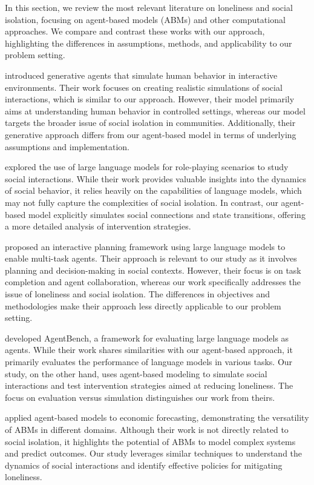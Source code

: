 \documentclass{article} %
\begin{document}
In this section, we review the most relevant literature on loneliness and social isolation, focusing on agent-based models (ABMs) and other computational approaches. We compare and contrast these works with our approach, highlighting the differences in assumptions, methods, and applicability to our problem setting.

\citet{park2023generative} introduced generative agents that simulate human behavior in interactive environments. Their work focuses on creating realistic simulations of social interactions, which is similar to our approach. However, their model primarily aims at understanding human behavior in controlled settings, whereas our model targets the broader issue of social isolation in communities. Additionally, their generative approach differs from our agent-based model in terms of underlying assumptions and implementation.

\citet{shanahan2023role} explored the use of large language models for role-playing scenarios to study social interactions. While their work provides valuable insights into the dynamics of social behavior, it relies heavily on the capabilities of language models, which may not fully capture the complexities of social isolation. In contrast, our agent-based model explicitly simulates social connections and state transitions, offering a more detailed analysis of intervention strategies.

\citet{wang2023describe} proposed an interactive planning framework using large language models to enable multi-task agents. Their approach is relevant to our study as it involves planning and decision-making in social contexts. However, their focus is on task completion and agent collaboration, whereas our work specifically addresses the issue of loneliness and social isolation. The differences in objectives and methodologies make their approach less directly applicable to our problem setting.

\citet{liu2023agentbench} developed AgentBench, a framework for evaluating large language models as agents. While their work shares similarities with our agent-based approach, it primarily evaluates the performance of language models in various tasks. Our study, on the other hand, uses agent-based modeling to simulate social interactions and test intervention strategies aimed at reducing loneliness. The focus on evaluation versus simulation distinguishes our work from theirs.

\citet{poledna2023economic} applied agent-based models to economic forecasting, demonstrating the versatility of ABMs in different domains. Although their work is not directly related to social isolation, it highlights the potential of ABMs to model complex systems and predict outcomes. Our study leverages similar techniques to understand the dynamics of social interactions and identify effective policies for mitigating loneliness.
\end{document}
